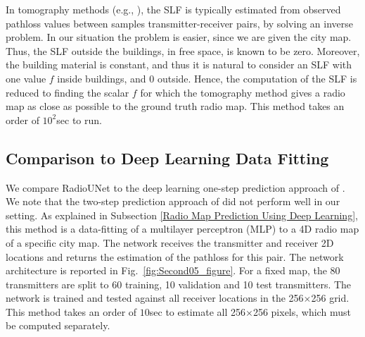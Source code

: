 \documentclass[10pt,a4paper]{article}
\begin{document}
In tomography methods (e.g., \cite{BlindTomo,ElasticNets,LowRankOutliers,AdaptiveBayesian,VariationalBayes}), the SLF is typically estimated from observed pathloss values between samples transmitter-receiver pairs, by solving an inverse problem.  In our situation the problem is easier, since we are given the city map. Thus, the SLF outside the buildings, in free space, is known to be zero.
Moreover, the building material is constant, and thus it is natural to consider an SLF with one value $f$ inside buildings, and $0$ outside. Hence, the computation of the SLF is reduced to finding the scalar $f$ for which the tomography method gives a radio map as close as possible to the ground truth radio map. This method takes an order of $10^2$sec to run. %




\subsection{Comparison to Deep Learning Data Fitting}

We compare RadioUNet to the deep learning one-step prediction approach of \cite{DocomoTwoStep}. We note that the two-step prediction approach of \cite{DocomoTwoStep} did not perform well in our setting.
As explained in Subsection \ref{Radio Map Prediction Using Deep Learning}, this method is a data-fitting of a multilayer perceptron (MLP) to a 4D radio map of a specific city map. The network receives the transmitter and receiver 2D locations and returns the estimation of the pathloss for this pair. The network architecture is reported in Fig.~\ref{fig:Second05_figure}. For a fixed map, the 80 transmitters are split to 60 training, 10 validation and 10 test transmitters. The network is trained and tested against all receiver locations in the 
256$\times$256 grid. This method takes an order of $10$sec to estimate all 256$\times$256 pixels, which must be computed separately.
\end{document}
